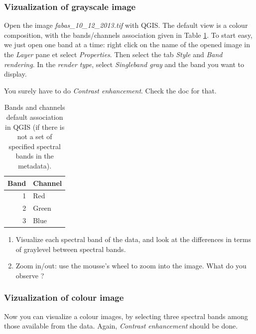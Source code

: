 \documentclass[a4paper,11pt,DIV=18]{scrartcl}
\begin{document}
\subsubsection{Vizualization of grayscale image}
\label{sec:orgheadline15}
Open the image  \emph{fabas\_10\_12\_2013.tif} with QGIS. The default  view is a
colour composition, with the bands/channels association given in Table
\ref{tab:orgtable8}. To start easy, we just open  one band at a time: right click
on  the  name  of  the  opened  image in  the  \emph{Layer}  pane  et  select
\emph{Properties}.   Then select  the tab  \emph{Style} and  \emph{Band rendering}.  In the
\emph{render type}, select \emph{Singleband gray} and the band you want to display.

You surely have to do \emph{Contrast enhancement}. Check the doc for that.

\begin{table}[htb]
\caption{\label{tab:orgtable8}
Bands and channels default association in QGIS (if there is not a set of specified spectral bands in the metadata).}
\centering
\begin{tabular}{rl}
\toprule
Band & Channel\\
\midrule
1 & Red\\
2 & Green\\
3 & Blue\\
\bottomrule
\end{tabular}
\end{table}

\begin{work}
\begin{enumerate}
\item Visualize  each  spectral  band  of the  data,  and  look  at  the
differences in terms of graylevel between spectral bands.
\item Zoom in/out: use the mousse's wheel to zoom into the image. What do
you observe ?
\end{enumerate}
\end{work}
\subsubsection{Vizualization of colour image}
\label{sec:orgheadline16}
Now you  can visualize  a colour images,  by selecting  three spectral
bands among those available  from the data. Again, \emph{Contrast
enhancement} should be done.
\end{document}
